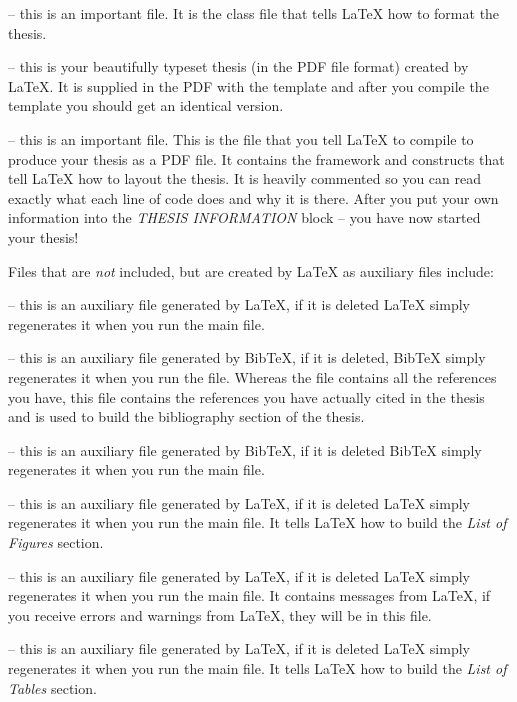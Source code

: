  -- this is an important file. It is the class file that tells \LaTeX{} how to format the thesis. 

 -- this is your beautifully typeset thesis (in the PDF file format) created by \LaTeX{}. It is supplied in the PDF with the template and after you compile the template you should get an identical version.

 -- this is an important file. This is the file that you tell \LaTeX{} to compile to produce your thesis as a PDF file. It contains the framework and constructs that tell \LaTeX{} how to layout the thesis. It is heavily commented so you can read exactly what each line of code does and why it is there. After you put your own information into the \emph{THESIS INFORMATION} block -- you have now started your thesis!

Files that are \emph{not} included, but are created by \LaTeX{} as auxiliary files include:

 -- this is an auxiliary file generated by \LaTeX{}, if it is deleted \LaTeX{} simply regenerates it when you run the main  file.

 -- this is an auxiliary file generated by BibTeX, if it is deleted, BibTeX simply regenerates it when you run the  file. Whereas the  file contains all the references you have, this  file contains the references you have actually cited in the thesis and is used to build the bibliography section of the thesis.

 -- this is an auxiliary file generated by BibTeX, if it is deleted BibTeX simply regenerates it when you run the main  file.

 -- this is an auxiliary file generated by \LaTeX{}, if it is deleted \LaTeX{} simply regenerates it when you run the main  file. It tells \LaTeX{} how to build the \emph{List of Figures} section.

 -- this is an auxiliary file generated by \LaTeX{}, if it is deleted \LaTeX{} simply regenerates it when you run the main  file. It contains messages from \LaTeX{}, if you receive errors and warnings from \LaTeX{}, they will be in this  file.

 -- this is an auxiliary file generated by \LaTeX{}, if it is deleted \LaTeX{} simply regenerates it when you run the main  file. It tells \LaTeX{} how to build the \emph{List of Tables} section.

